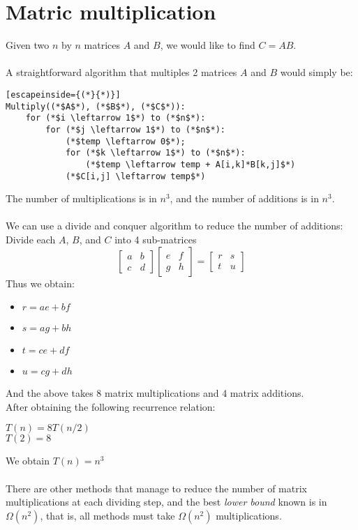 \documentclass[a4paper]{article}
\begin{document}
\section{Matric multiplication}
Given two $n$ by $n$ matrices $A$ and $B$, we would like to find $C=AB$.\\
\\A straightforward algorithm that multiples 2 matrices $A$ and $B$ would simply be:
\begin{lstlisting}[escapeinside={(*}{*)}]
Multiply((*$A$*), (*$B$*), (*$C$*)):
	for (*$i \leftarrow 1$*) to (*$n$*):
		for (*$j \leftarrow 1$*) to (*$n$*):
			(*$temp \leftarrow 0$*);
			for (*$k \leftarrow 1$*) to (*$n$*):
				(*$temp \leftarrow temp + A[i,k]*B[k,j]$*)
			(*$C[i,j] \leftarrow temp$*)
\end{lstlisting}
The number of multiplications is in $n^3$, and the number of additions is in $n^3$.\\
\\ We can use a divide and conquer algorithm to reduce the number of additions:\\
Divide each $A$, $B$, and $C$ into 4 sub-matrices
\[
\begin{bmatrix}
a & b \\
c & d
\end{bmatrix}
\begin{bmatrix}
e & f \\
g & h
\end{bmatrix}
=
\begin{bmatrix}
r & s \\
t & u
\end{bmatrix}
\]
Thus we obtain:
\begin{itemize}
	\item[] $r=ae+bf$
	\item[] $s=ag+bh$
	\item[] $t=ce+df$
	\item[] $u=cg+dh$
\end{itemize}
And the above takes 8 matrix multiplications and 4 matrix additions.\\
After obtaining the following recurrence relation:
\begin{center}
	$T(n) = 8T(n/2)$\\
	$T(2) = 8$
\end{center}
We obtain $T(n) = n^3$\\
\\There are other methods that manage to reduce the number of matrix multiplications at each dividing step, and the best \textit{lower bound} known is in $\Omega(n^2)$, that is, all methods must take $\Omega(n^2)$ multiplications.
\appendix
\end{document}
